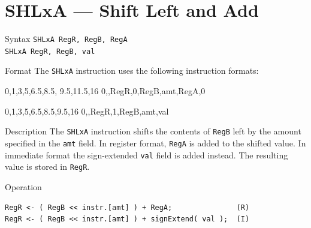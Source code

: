 %
%
%
\pagebreak
\section*{SHLxA — Shift Left and Add}

\begin{iPageDescEntry}{Syntax}
\texttt{SHLxA RegR, RegB, RegA} \\
\texttt{SHLxA RegR, RegB, val}
\end{iPageDescEntry}

\begin{iPageDescEntry}{Format}
The \texttt{SHLxA} instruction uses the following instruction formats: \\

\begin{flushleft}
\drawInstrFormat
    {0,1,3,5,6.5,8.5, 9.5,11.5,16}
    {0,\OpCodeSHLxA,RegR,0,RegB,amt,RegA,0}
\end{flushleft}

\medskip
\begin{flushleft}
\drawInstrFormat
    {0,1,3,5,6.5,8.5,9.5,16}
    {0,\OpCodeSHLxA,RegR,1,RegB,amt,val}
\end{flushleft}
\end{iPageDescEntry}

\begin{iPageDescEntry}{Description}
The \texttt{SHLxA} instruction shifts the contents of \texttt{RegB} left by the amount specified in the \texttt{amt} field. In register format, \texttt{RegA} is added to the shifted value. In immediate format the sign-extended \texttt{val} field is added instead.  The resulting value is stored in \texttt{RegR}.
\end{iPageDescEntry}

\begin{iPageDescOpEntry}{Operation}
\begin{lstlisting}[style=iPageOpStyle]
RegR <- ( RegB << instr.[amt] ) + RegA;               (R)
RegR <- ( RegB << instr.[amt] ) + signExtend( val );  (I)
\end{lstlisting}
\end{iPageDescOpEntry}

